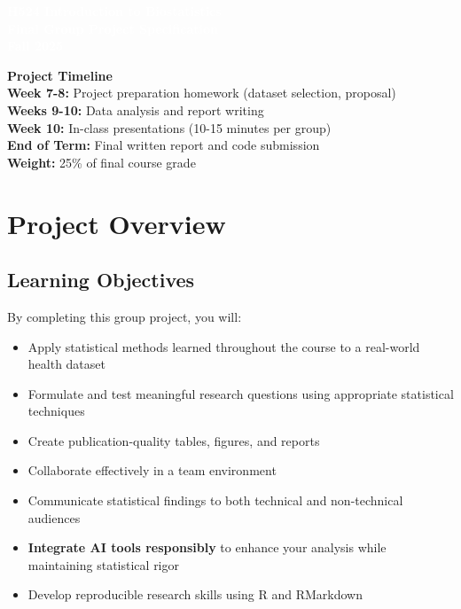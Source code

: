 \documentclass[11pt]{article}
\title{}
\author{}
\date{}
\begin{document}
\begin{tcolorbox}[colback=osaorange,colframe=black,boxrule=2pt,arc=0pt,left=3pt,right=3pt,top=6pt,bottom=6pt,boxsep=2pt]
\centering
\textcolor{white}{\textbf{\Large H524 Introduction to Biostatistics}}\\
\textcolor{white}{\textbf{\Large Final Group Project Specification}}\\
\textcolor{white}{\textbf{\Large Fall 2025}}
\end{tcolorbox}

\vspace{8pt}

\noindent\textbf{Project Timeline}\\
\textbf{Week 7-8:} Project preparation homework (dataset selection, proposal)\\
\textbf{Weeks 9-10:} Data analysis and report writing\\
\textbf{Week 10:} In-class presentations (10-15 minutes per group)\\
\textbf{End of Term:} Final written report and code submission\\
\textbf{Weight:} 25\% of final course grade

\section{Project Overview}

\subsection{Learning Objectives}

By completing this group project, you will:

\begin{itemize}
\item Apply statistical methods learned throughout the course to a real-world health dataset
\item Formulate and test meaningful research questions using appropriate statistical techniques
\item Create publication-quality tables, figures, and reports
\item Collaborate effectively in a team environment
\item Communicate statistical findings to both technical and non-technical audiences
\item \textcolor{aiblue}{\textbf{Integrate AI tools responsibly} to enhance your analysis while maintaining statistical rigor}
\item Develop reproducible research skills using R and RMarkdown
\end{itemize}
\end{document}
